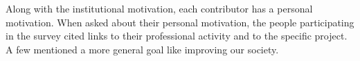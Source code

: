 \documentclass[letterpaper, 10 pt, conference]{ieeeconf}  %
\begin{document}
Along with the institutional motivation, each contributor has a personal motivation.
When asked about their personal motivation, the people participating in the survey cited links to their professional activity and to the specific project.
A few mentioned a more general goal like improving our society.

\end{document}
